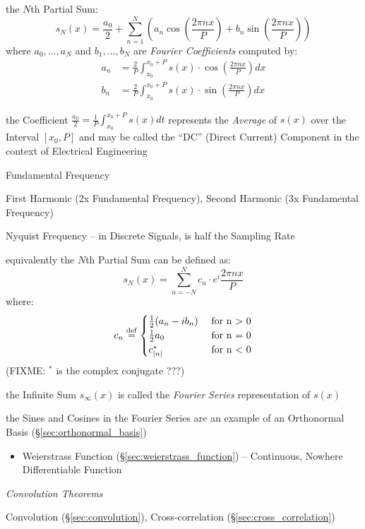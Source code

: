 the $N$th Partial Sum:
\[
  s_N(x) = \frac{a_0}{2} + \sum_{n=1}^N \left(
    a_n\cos(\frac{2\pi{nx}}{P}) + b_n\sin(\frac{2\pi{nx}}{P})
  \right)
\]
where $a_0,\ldots,a_N$ and $b_1,\ldots,b_N$ are \emph{Fourier Coefficients}
computed by:
\begin{align*}
  a_n & = \frac{2}{P}\int_{x_0}^{x_0+P}s(x) \cdot \cos(\frac{2\pi{nx}}{P}) dx \\
  b_n & = \frac{2}{P}\int_{x_0}^{x_0+P}s(x) \cdot \sin(\frac{2\pi{nx}}{P}) dx
\end{align*}

the Coefficient $\frac{a_0}{2} = \frac{1}{P}\int_{x_0}^{x_0+P}s(x)dt$ represents
the \emph{Average} of $s(x)$ over the Interval $[x_0,P]$ and may be called the
``DC'' (Direct Current) Component in the context of Electrical Engineering

Fundamental Frequency

First Harmonic (2x Fundamental Frequency), Second Harmonic (3x Fundamental
Frequency)

Nyquist Frequency -- in Discrete Signals, is half the Sampling Rate

equivalently the $N$th Partial Sum can be defined as:
\[
  s_N(x) = \sum_{n=-N}^N c_n \cdot e^i\frac{2\pi{nx}}{P}
\]
where:
\[
  c_n \stackrel{\mathrm{def}}= \begin{cases}
    \frac{1}{2}(a_n - ib_n) &\ \text{for n > 0} \\
    \frac{1}{2}a_0          &\ \text{for n = 0} \\
    c_{|n|}^*               &\ \text{for n < 0}
  \end{cases}
\]
(FIXME: $^*$ is the complex conjugate ???)

the Infinite Sum $s_\infty(x)$ is called the \emph{Fourier Series}
representation of $s(x)$

the Sines and Cosines in the Fourier Series are an example of an Orthonormal
Basis (\S\ref{sec:orthonormal_basis})

\begin{itemize}
  \item Weierstrass Function (\S\ref{sec:weierstrass_function}) -- Continuous,
    Nowhere Differentiable Function
\end{itemize}


\emph{Convolution Theorems}

Convolution (\S\ref{sec:convolution}), Cross-correlation
(\S\ref{sec:cross_correlation})



